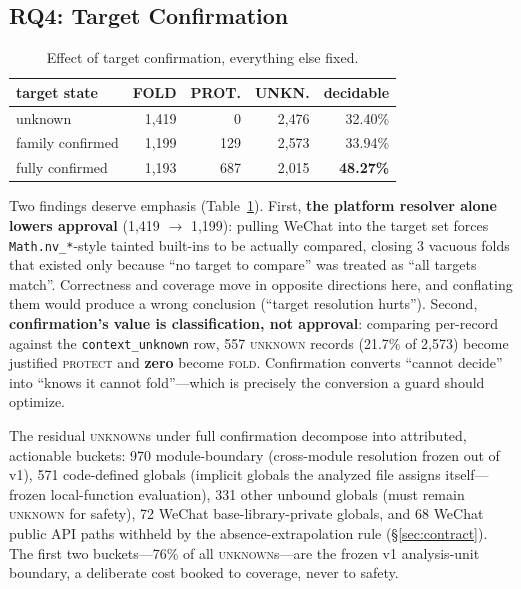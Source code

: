 \documentclass[sigconf,nonacm]{acmart}
\begin{document}
\subsection{RQ4: Target Confirmation}\label{sec:rq4}

\begin{table}[t]
  \centering
  \caption{Effect of target confirmation, everything else fixed.}
  \label{tab:confirmation}
  \small
  \begin{tabular}{lrrrr}
    \toprule
    target state & FOLD & PROT. & UNKN. & decidable \\
    \midrule
    unknown & 1{,}419 & 0 & 2{,}476 & 32.40\% \\
    family confirmed & 1{,}199 & 129 & 2{,}573 & 33.94\% \\
    fully confirmed & 1{,}193 & 687 & 2{,}015 & \textbf{48.27\%} \\
    \bottomrule
  \end{tabular}
\end{table}

Two findings deserve emphasis (Table~\ref{tab:confirmation}). First, \textbf{the platform resolver alone lowers approval} (1{,}419 $\to$ 1{,}199): pulling WeChat into the target set forces \texttt{Math.nv\_*}-style tainted built-ins to be actually compared, closing 3 vacuous folds that existed only because ``no target to compare'' was treated as ``all targets match''. Correctness and coverage move in opposite directions here, and conflating them would produce a wrong conclusion (``target resolution hurts''). Second, \textbf{confirmation's value is classification, not approval}: comparing per-record against the \texttt{context\_unknown} row, 557 \textsc{unknown} records (21.7\% of 2{,}573) become justified \textsc{protect} and \textbf{zero} become \textsc{fold}. Confirmation converts ``cannot decide'' into ``knows it cannot fold''---which is precisely the conversion a guard should optimize.

The residual \textsc{unknown}s under full confirmation decompose into attributed, actionable buckets: 970 module-boundary (cross-module resolution frozen out of v1), 571 code-defined globals (implicit globals the analyzed file assigns itself---frozen local-function evaluation), 331 other unbound globals (must remain \textsc{unknown} for safety), 72 WeChat base-library-private globals, and 68 WeChat public API paths withheld by the absence-extrapolation rule (\S\ref{sec:contract}). The first two buckets---76\% of all \textsc{unknown}s---are the frozen v1 analysis-unit boundary, a deliberate cost booked to coverage, never to safety.
\end{document}
